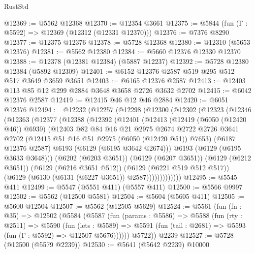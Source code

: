 \begin{lexlean}{RustStd}
\begin{coremodule}
@12369 := @5562 @12368
@12370 := @12354 @3661
@12375 := @5844 (fun (Γ : @5592) => @12369 (@12312 (@12331 @12370)))
@12376 := @7376 @8290
@12377 := @12375 @12376
@12378 := @5728 @12368
@12380 := @12310 (@5653 @12376)
@12381 := @5562 @12380
@12384 := @5660 @12376 @12330 @12370
@12388 := @12378 (@12381 @12384) (@5887 @12237)
@12392 := @5728 @12380 @12384 (@5892 @12309)
@12401 := @6152 @12376 @2587 @519 @295 @512 @517 @3649 @3659 @3651
@12403 := @6165 @12376 @2587
@12413 := @12403 @113 @85 @12 @299 @2884 @3648 @3658 @2726 @3632 @2702
@12415 := @6042 @12376 @2587
@12419 := @12415 @46 @12 @46 @2884
@12420 := @6051 @12376
@12494 := @12232
    (@12257
      (@12298
        (@12300
          (@12302
            (@12323
              (@12346
                (@12363
                  (@12377
                    (@12388
                      (@12392
                        (@12401
                          (@12413
                            (@12419 (@6050 (@12420 @46)) @6939)
                            (@12403
                              @82
                              @84
                              @16
                              @21
                              @2975
                              @2674
                              @2722
                              @2726
                              @3641
                              @2702
                              (@12415 @51 @16 @51 @2975 (@6050 (@12420 @51)) @7653)
                              (@6187 @12376 @2587)
                              @6193
                              (@6129 (@6195 @3642 @2674)))
                            @6193
                            (@6129 (@6195 @3633 @3648)))
                          (@6202 (@6203 @3651))
                          (@6129 (@6207 @3651))
                          (@6129 (@6212 @3651))
                          (@6129 (@6216 @3651 @512))
                          (@6129 (@6221 @519 @512 @517))
                          (@6129 (@6130 (@6131 (@6227 @3651)) @2587)))))))))))))
@12495 := @5545 @411
@12499 := @5547 (@5551 @411) (@5557 @411)
@12500 := @5566 @9997
@12502 := @5562 (@12500 @5581)
@12504 := @5604 (@5605 @411)
@12505 := @5600 @12504
@12507 := @5562 (@12505 @5629)
@12524 := @5561
    (fun (fn : @35) =>
    @12502
      (@5584
        (@5587
          (fun (params : @5586) =>
          @5588
            (fun (rty : @2511) =>
            @5590
              (fun (lets : @5589) =>
              @5591 (fun (tail : @2681) => @5593 (fun (Γ : @5592) => @12507 @5676))))))
        @5722))
    @2239
@12527 := @5728 (@12500 (@5579 @2239))
@12530 := @5641 (@5642 @2239) @10000

\end{coremodule}
\end{lexlean}
